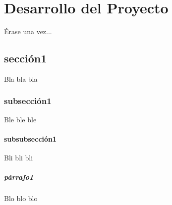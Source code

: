 	\chapter{Desarrollo del Proyecto}\label{cap.desarrollo}
	
	Érase una vez...
	\section{sección1}
	Bla bla bla
	\subsection{subsección1}
	Ble ble ble
	\subsubsection{subsubsección1}
	Bli bli bli
	\paragraph{párrafo1}
	Blo blo blo



	\newpage
	$\ $